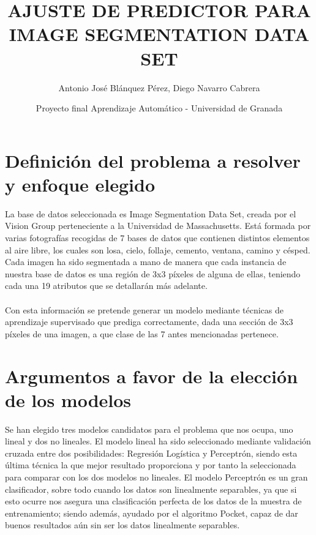\documentclass{article}
\title{AJUSTE DE PREDICTOR PARA IMAGE SEGMENTATION DATA SET}
\author{Antonio José Blánquez Pérez, Diego Navarro Cabrera}
\date{Proyecto final Aprendizaje Automático - Universidad de Granada}
\begin{document}
	\maketitle
	

	\section{Definición del problema a resolver y enfoque elegido} %
	La base de datos seleccionada es Image Segmentation Data Set, creada por el Vision Group perteneciente a la Universidad de Massachusetts. Está formada por varias fotografías recogidas de 7 bases de datos que contienen distintos elementos al aire libre, los cuales son losa, cielo, follaje, cemento, ventana, camino y césped. Cada imagen ha sido segmentada a mano de manera que cada instancia de nuestra base de datos es una región de 3x3 píxeles de alguna de ellas, teniendo cada una 19 atributos que se detallarán más adelante.\\\\
	Con esta información se pretende generar un modelo mediante técnicas de aprendizaje supervisado que prediga correctamente, dada una sección de 3x3 píxeles de una imagen, a que clase de las 7 antes mencionadas pertenece.
	
	\section{Argumentos a favor de la elección de los modelos} %
	
	Se han elegido tres modelos candidatos para el problema que nos ocupa, uno lineal y dos no lineales. El modelo lineal ha sido seleccionado mediante validación cruzada entre dos posibilidades: Regresión Logística y Perceptrón, siendo esta última técnica la que mejor resultado proporciona y por tanto la seleccionada para comparar con los dos modelos no lineales. El modelo Perceptrón es un gran clasificador, sobre todo cuando los datos son linealmente separables, ya que si esto ocurre nos asegura una clasificación perfecta de los datos de la muestra de entrenamiento; siendo además, ayudado por el algoritmo Pocket, capaz de dar buenos resultados aún sin ser los datos linealmente separables.
	
\end{document}
